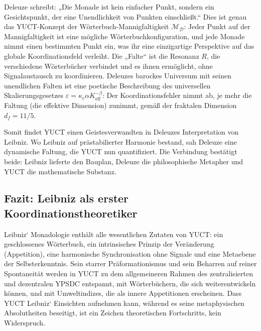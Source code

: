 \documentclass[12pt,a4paper]{article}
\begin{document}
	Deleuze schreibt: „Die Monade ist kein einfacher Punkt, sondern ein Gesichtspunkt, der eine Unendlichkeit von Punkten einschließt.“ Dies ist genau das YUCT-Konzept der Wörterbuch-Mannigfaltigkeit \(\mathcal{M}_{\mathcal{D}}\): Jeder Punkt auf der Mannigfaltigkeit ist eine mögliche Wörterbuchkonfiguration, und jede Monade nimmt einen bestimmten Punkt ein, was ihr eine einzigartige Perspektive auf das globale Koordinationsfeld verleiht. Die „Falte“ ist die Resonanz \(R\), die verschiedene Wörterbücher verbindet und es ihnen ermöglicht, ohne Signalaustausch zu koordinieren. Deleuzes barockes Universum mit seinen unendlichen Falten ist eine poetische Beschreibung des universellen Skalierungsgesetzes \(\varepsilon = \kappa_c \alpha K_{\mathrm{eff}}^{-\beta}\): Der Koordinationsfehler nimmt ab, je mehr die Faltung (die effektive Dimension) zunimmt, gemäß der fraktalen Dimension \(d_f = 11/5\).
	
	Somit findet YUCT einen Geistesverwandten in Deleuzes Interpretation von Leibniz. Wo Leibniz auf prästabilierter Harmonie bestand, sah Deleuze eine dynamische Faltung, die YUCT nun quantifiziert. Die Verbindung bestätigt beide: Leibniz lieferte den Bauplan, Deleuze die philosophische Metapher und YUCT die mathematische Substanz.
	
	\subsection{Fazit: Leibniz als erster Koordinationstheoretiker}
	
	Leibniz‘ Monadologie enthält alle wesentlichen Zutaten von YUCT: ein geschlossenes Wörterbuch, ein intrinsisches Prinzip der Veränderung (Appetition), eine harmonische Synchronisation ohne Signale und eine Metaebene der Selbsterkenntnis. Sein starrer Präformationismus und sein Beharren auf reiner Spontaneität werden in YUCT zu dem allgemeineren Rahmen des zentralisierten und dezentralen YPSDC entspannt, mit Wörterbüchern, die sich weiterentwickeln können, und mit Umweltindizes, die als innere Appetitionen erscheinen. Dass YUCT Leibniz‘ Einsichten aufnehmen kann, während es seine metaphysischen Absolutheiten beseitigt, ist ein Zeichen theoretischen Fortschritts, kein Widerspruch.
	
\end{document}
